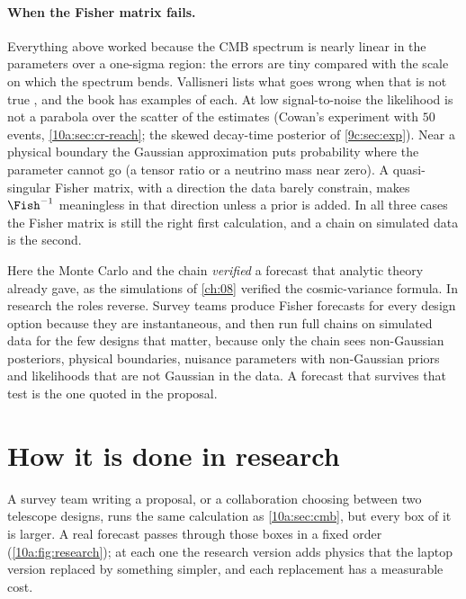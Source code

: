 \paragraph{When the Fisher matrix fails.} Everything above worked because the CMB spectrum is nearly linear in the
parameters over a one-sigma region: the errors are tiny compared with the scale on which the spectrum bends.
Vallisneri lists what goes wrong when that is not true \cite{Vallisneri2008}, and the book has examples of each. At
low signal-to-noise the likelihood is not a parabola over the scatter of the estimates (Cowan's experiment with
$50$ events, \cref{10a:sec:cr-reach}; the skewed decay-time posterior of \cref{9c:sec:exp}). Near a physical boundary the
Gaussian approximation puts probability where the parameter cannot go (a tensor ratio or a neutrino mass near zero).
A quasi-singular Fisher matrix, with a direction the data barely constrain, makes $\Fish^{-1}$ meaningless in that
direction unless a prior is added. In all three cases the Fisher matrix is still the right first calculation, and
a chain on simulated data is the second.

\begin{inpractice}
Here the Monte Carlo and the chain \emph{verified} a forecast that analytic theory already gave, as the
simulations of \cref{ch:08} verified the cosmic-variance formula. In research the roles reverse. Survey teams
produce Fisher forecasts for every design option because they are instantaneous, and then run full
chains on simulated data for the few designs that matter, because only the chain sees non-Gaussian
posteriors, physical boundaries, nuisance parameters with non-Gaussian priors and likelihoods that are not
Gaussian in the data. A forecast that survives that test is the one quoted in the proposal.
\end{inpractice}
\section{How it is done in research}
\label{10a:sec:research}

A survey team writing a proposal, or a collaboration choosing between two telescope designs, runs the same
calculation as \cref{10a:sec:cmb}, but every box of it is larger. A real forecast passes through those
boxes in a fixed order (\cref{10a:fig:research}); at each one the research version adds physics that the laptop
version replaced by something simpler, and each replacement has a measurable cost.

